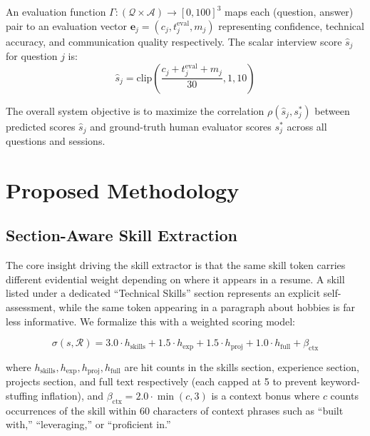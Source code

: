 \documentclass[conference]{IEEEtran}
\begin{document}
An evaluation function $\Gamma: (\mathcal{Q} \times \mathcal{A}) \rightarrow [0,100]^3$ maps each (question, answer) pair to an evaluation vector $\mathbf{e}_j = (c_j, t^{\text{eval}}_j, m_j)$ representing confidence, technical accuracy, and communication quality respectively. The scalar interview score $\hat{s}_j$ for question $j$ is:
\begin{equation}
    \hat{s}_j = \text{clip}\!\left(\frac{c_j + t^{\text{eval}}_j + m_j}{30}, 1, 10\right)
    \label{eq:score}
\end{equation}

The overall system objective is to maximize the correlation $\rho(\hat{s}_j, s^*_j)$ between predicted scores $\hat{s}_j$ and ground-truth human evaluator scores $s^*_j$ across all questions and sessions.

\section{Proposed Methodology}
\label{sec:methodology}

\subsection{Section-Aware Skill Extraction}

The core insight driving the skill extractor is that the same skill token carries different evidential weight depending on where it appears in a resume. A skill listed under a dedicated ``Technical Skills'' section represents an explicit self-assessment, while the same token appearing in a paragraph about hobbies is far less informative. We formalize this with a weighted scoring model:

\begin{equation}
    \sigma(s, \mathcal{R}) = 3.0 \cdot h_{\text{skills}} + 1.5 \cdot h_{\text{exp}} + 1.5 \cdot h_{\text{proj}} + 1.0 \cdot h_{\text{full}} + \beta_{\text{ctx}}
    \label{eq:skill_score}
\end{equation}

where $h_{\text{skills}}, h_{\text{exp}}, h_{\text{proj}}, h_{\text{full}}$ are hit counts in the skills section, experience section, projects section, and full text respectively (each capped at 5 to prevent keyword-stuffing inflation), and $\beta_{\text{ctx}} = 2.0 \cdot \min(c, 3)$ is a context bonus where $c$ counts occurrences of the skill within 60 characters of context phrases such as ``built with,'' ``leveraging,'' or ``proficient in.''
\end{document}
